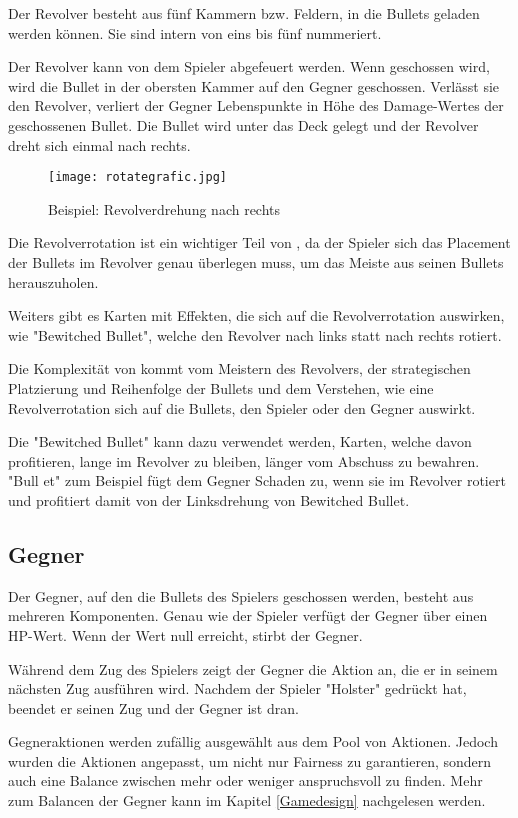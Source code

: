 Der Revolver besteht aus fünf Kammern bzw. Feldern, in die Bullets geladen werden können.
Sie sind intern von eins bis fünf nummeriert.


Der Revolver kann von dem Spieler abgefeuert werden. Wenn geschossen wird, wird die Bullet in der obersten Kammer auf den Gegner geschossen.
Verlässt sie den Revolver, verliert der Gegner Lebenspunkte in Höhe des Damage-Wertes der geschossenen Bullet.
Die Bullet wird unter das Deck gelegt und der Revolver dreht sich einmal nach rechts.

\begin{figure}[H]
    \texttt{[image: rotategrafic.jpg]}
    \caption{Beispiel: Revolverdrehung nach rechts}
\end{figure}


Die Revolverrotation ist ein wichtiger Teil von \FF, da der Spieler sich das Placement der Bullets im Revolver genau überlegen muss,
um das Meiste aus seinen Bullets herauszuholen.


Weiters gibt es Karten mit Effekten, die sich auf die Revolverrotation auswirken, wie \zB "Bewitched Bullet",
welche den Revolver nach links statt nach rechts rotiert.


Die Komplexität von \FF kommt vom Meistern des Revolvers, der strategischen Platzierung und Reihenfolge der Bullets und dem Verstehen,
wie eine Revolverrotation sich auf die Bullets, den Spieler oder den Gegner auswirkt.


Die "Bewitched Bullet" kann \zB dazu verwendet werden, Karten,
welche davon profitieren, lange im Revolver zu bleiben, länger vom Abschuss zu bewahren. "Bull et" zum Beispiel fügt dem Gegner Schaden zu,
wenn sie im Revolver rotiert und profitiert damit von der Linksdrehung von Bewitched Bullet.%


\subsection{Gegner}\label{gegner}
Der Gegner, auf den die Bullets des Spielers geschossen werden, besteht aus mehreren Komponenten.
Genau wie der Spieler verfügt der Gegner über einen HP-Wert. Wenn der Wert null erreicht, stirbt der Gegner.


Während dem Zug des Spielers zeigt der Gegner die Aktion an, die er in seinem nächsten Zug ausführen wird.
Nachdem der Spieler "Holster" gedrückt hat, beendet er seinen Zug und der Gegner ist dran.

Gegneraktionen werden zufällig ausgewählt aus dem Pool von Aktionen.
Jedoch wurden die Aktionen angepasst, um nicht nur Fairness zu garantieren,
sondern auch eine Balance zwischen mehr oder weniger anspruchsvoll zu finden.
Mehr zum Balancen der Gegner kann im Kapitel \ref{Gamedesign} nachgelesen werden.


